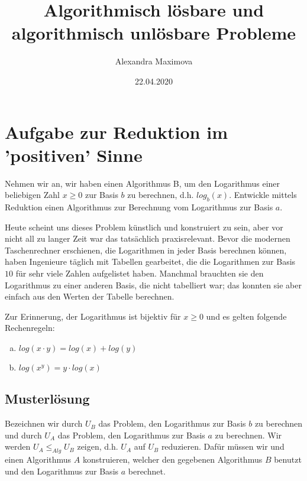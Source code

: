 \documentclass[
	12pt, %
	german, %
]{fphw}
\title{Algorithmisch lösbare und algorithmisch unlösbare Probleme} %
\author{Alexandra Maximova} %
\date{22.04.2020} %
\institute{ETH Zurich \\ Lehrdiplom Informatik} %
\begin{document}
\maketitle %


\section*{Aufgabe zur Reduktion im 'positiven' Sinne}

\begin{problem}
	Nehmen wir an, wir haben einen Algorithmus B, um den Logarithmus einer beliebigen Zahl \(x \geq 0\) zur Basis \(b\) zu berechnen, d.h. \(log_b(x)\). Entwickle mittels Reduktion einen Algorithmus zur Berechnung vom Logarithmus zur Basis \(a\).
	
	Heute scheint uns dieses Problem künstlich und konstruiert zu sein, aber vor nicht all zu langer Zeit war das tatsächlich praxisrelevant. Bevor die modernen Taschenrechner erschienen, die Logarithmen in jeder Basis berechnen können, haben Ingenieure täglich mit Tabellen gearbeitet, die die Logarithmen zur Basis \(10\) für sehr viele Zahlen aufgelistet haben. Manchmal brauchten sie den Logarithmus zu einer anderen Basis, die nicht tabelliert war; das konnten sie aber einfach aus den Werten der Tabelle berechnen.
	
	Zur Erinnerung, der Logarithmus ist bijektiv für \(x \geq 0\) und es gelten folgende Rechenregeln:
	\begin{enumerate}[(a)]
		\item \( log(x \cdot y) = log(x) + log(y) \)
		\item \( log(x^y) = y \cdot log(x) \)
	\end{enumerate}
\end{problem}



\subsection*{Musterlösung}

Bezeichnen wir durch \(U_B\) das Problem, den Logarithmus zur Basis \(b\) zu berechnen und durch \(U_A\) das Problem, den Logarithmus zur Basis \(a\) zu berechnen. Wir werden \(U_A \leq_{Alg} U_B\) zeigen, d.h. \(U_A\) auf \(U_B\) reduzieren. Dafür müssen wir und einen Algorithmus \(A\) konstruieren, welcher den gegebenen Algorithmus \(B\) benutzt und den Logarithmus zur Basis \(a\) berechnet.
\end{document}
